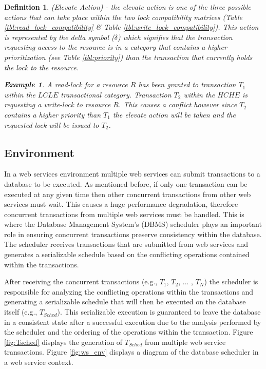 \documentclass[conference]{IEEEtran}
\newtheorem{definition}{Definition}
\newtheorem{example}{Example}[definition]
\begin{document}
\begin{definition}
\label{elevate_action}
 (Elevate Action) - the elevate action is one of the three possible actions that can take place within the two lock compatibility matrices (Table \ref{tbl:read_lock_compatibility} \& Table \ref{tbl:write_lock_compatibility}). This action is represented by the delta symbol ($\delta$) which signifies that the transaction requesting access to the resource is in a category that contains a higher prioritization (see Table \ref{tbl:priority}) than the transaction that currently holds the lock to the resource.
 
 \begin{example}
 \label{ex_elevate_action}
  A read-lock for a resource $R$ has been granted to transaction $T_{1}$ within the $LCLE$ transactional category. Transaction $T_{2}$ within the $HCHE$ is requesting a write-lock to resource $R$. This causes a conflict however since $T_{2}$ contains a higher priority than $T_{1}$ the elevate action will be taken and the requested lock will be issued to $T_{2}$.
 \end{example}
 
\end{definition}

\subsection{Environment}
In a web services environment multiple web services can submit transactions to a database to be executed. As mentioned before, if only one transaction can be executed at any given time then other concurrent transactions from other web services must wait. This causes a huge performance degradation, therefore concurrent transactions from multiple web services must be handled. This is where the Database Management System's (DBMS) scheduler plays an important role in ensuring concurrent transactions preserve consistency within the database. The scheduler receives transactions that are submitted from web services and generates a serializable schedule based on the conflicting operations contained within the transactions. 

After receiving the concurrent transactions (e.g., $T_{1}$, $T_{2}$, ... , $T_{N}$) the scheduler is responsible for analyzing the conflicting operations within the transactions and generating a serializable schedule that will then be executed on the database itself (e.g., $T_{Sched}$). This serializable execution is guaranteed to leave the database in a consistent state after a successful execution due to the analysis performed by the scheduler and the ordering of the operations within the transaction. Figure \ref{fig:Tsched} displays the generation of $T_{Sched}$ from multiple web service transactions. Figure \ref{fig:ws_env} displays a diagram of the database scheduler in a web service context.
\end{document}
